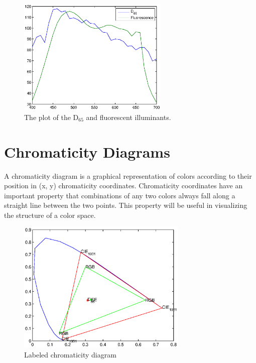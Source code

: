 \documentclass[paper=a4, fontsize=11pt]{scrartcl} %
\numberwithin{equation}{section} %
\numberwithin{figure}{section} %
\numberwithin{table}{section} %
\begin{document}
\begin{figure}[H]
	
	\centering
	\includegraphics[height = 2.2in]{3.eps}
	\caption{The plot of the D$_{65}$ and fluorescent illuminants.}
	
	
	
\end{figure}
	
\section{ Chromaticity Diagrams}

A chromaticity diagram is a graphical representation of colors according to their position in
(x, y) chromaticity coordinates. Chromaticity coordinates have an important property that
combinations of any two colors always fall along a straight line between the two points. This
property will be useful in visualizing the structure of a color space.






\begin{figure}[H]
	
\centering
\includegraphics[height = 2.5in]{4.eps}
\caption{Labeled chromaticity diagram}
		
		
	
\end{figure}
\end{document}
